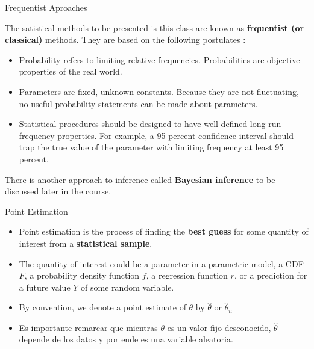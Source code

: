 \documentclass[handout]{beamer}
\begin{document}
\begin{frame}{Frequentist Aproaches}
\scriptsize{
The satistical methods to be presented is this class are known as \textbf{frquentist (or classical)} methods. They are based on the following postulates  \cite{wasserman2013all}:
\begin{itemize}
\item Probability refers to limiting relative frequencies. Probabilities are objective properties of the real world.
\item Parameters are fixed, unknown constants. Because they are not fluctuating, no useful probability statements can be made about parameters.
\item Statistical procedures should be designed to have well-defined long run frequency properties. For example, a 95 percent confidence interval should trap the true value of the parameter with limiting frequency at least 95 percent.
\end{itemize}
There is another approach to inference called \textbf{Bayesian inference} to be discussed later in the course.

} 
\end{frame}


\begin{frame}{Point Estimation}
\scriptsize{
\begin{itemize}
 \item Point estimation is the process of finding the \textbf{best guess} for some quantity of interest from a \textbf{statistical sample}.
 \item The quantity of interest could be a parameter in a parametric model, a CDF $F$, a probability density function $f$, a regression function $r$, or a prediction for a future value $Y$ of some random variable.
  \item By convention, we denote a point estimate of $\theta$ by $\hat{\theta}$ or $\hat{\theta}_n$ 
 \item Es importante remarcar que mientras $\theta$ es un valor fijo desconocido, $\hat{\theta}$  depende de los datos y por ende es una variable aleatoria. 

\end{itemize}

} 
\end{frame}
\end{document}
